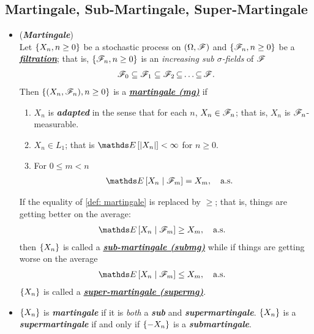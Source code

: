 \documentclass[11pt]{article}
\begin{document}
\subsection{Martingale, Sub-Martingale, Super-Martingale}
\begin{itemize}
\item \begin{definition} (\emph{\textbf{Martingale}}) \citep{resnick2013probability}\\
Let $\left\{X_n, n \ge 0\right\}$ be a stochastic process on $(\Omega, {\mathscr F})$ and $\left\{{\mathscr F}_n, n \ge 0\right\}$ be a \underline{\textbf{\emph{filtration}}}; that is, $\left\{{\mathscr F}_n, n \ge 0\right\}$ is an \emph{increasing sub $\sigma$-fields} of ${\mathscr F}$
\begin{align*}
{\mathscr F}_0 \subseteq {\mathscr F}_1 \subseteq {\mathscr F}_2 \,{\subseteq}\ldots{\subseteq}\, {\mathscr F}.
\end{align*} Then $\left\{ (X_n, {\mathscr F}_n),  n \ge 0\right\}$ is a \underline{\emph{\textbf{martingale (mg)}}} if
\begin{enumerate}
\item  $X_n$ is \emph{\textbf{adapted}} in the sense that for each $n$, $X_n \in {\mathscr F}_n$; that is, $X_n$ is ${\mathscr F}_n$-measurable.
\item  $X_n \in L_1$; that is $\E{}{\abs{X_n}} < \infty$ for $n \ge 0$.
\item For $0 \le m < n$
\begin{align}
\E{}{X_n \;|\; \srF_m} &= X_m, \quad \text{a.s.} \label{def: martingale}
\end{align}
\end{enumerate}
If the equality of \eqref{def: martingale} is replaced by $\ge$; that is, things are getting better on the average:
\begin{align}
\E{}{X_n \;|\; \srF_m} &\ge X_m, \quad \text{a.s.} \label{def: sub_martingale}
\end{align} then $\left\{X_n\right\}$ is called a \underline{\emph{\textbf{sub-martingale (submg)}}} while if things are getting worse on
the average
\begin{align}
\E{}{X_n \;|\; \srF_m} &\le X_m, \quad \text{a.s.} \label{def: sup_martingale}
\end{align}  $\left\{X_n\right\}$ is called a \underline{\emph{\textbf{super-martingale (supermg)}}}.
\end{definition}

\item \begin{remark}
$\left\{X_n\right\}$ is \emph{\textbf{martingale}} if it is \emph{both} a \emph{\textbf{sub}} and \emph{\textbf{supermartingale}}. $\left\{X_n\right\}$ is a \emph{\textbf{supermartingale}} if and only if $\left\{-X_n\right\}$ is a \emph{\textbf{submartingale}}.
\end{remark}


\end{itemize}
\end{document}
